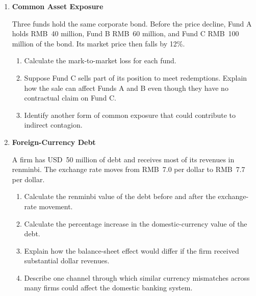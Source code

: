 \begin{enumerate}
\begin{enumerate}
\end{enumerate}


\item \textbf{Common Asset Exposure}

Three funds hold the same corporate bond. Before the price decline, Fund A holds RMB~40 million, Fund B RMB~60 million, and Fund C RMB~100 million of the bond. Its market price then falls by 12\%.

\begin{enumerate}

\item Calculate the mark-to-market loss for each fund.

\item Suppose Fund C sells part of its position to meet redemptions. Explain how the sale can affect Funds A and B even though they have no contractual claim on Fund C.

\item Identify another form of common exposure that could contribute to indirect contagion.

\end{enumerate}


\item \textbf{Foreign-Currency Debt}

A firm has USD~50 million of debt and receives most of its revenues in renminbi. The exchange rate moves from RMB~7.0 per dollar to RMB~7.7 per dollar.

\begin{enumerate}

\item Calculate the renminbi value of the debt before and after the exchange-rate movement.

\item Calculate the percentage increase in the domestic-currency value of the debt.

\item Explain how the balance-sheet effect would differ if the firm received substantial dollar revenues.
\item Describe one channel through which similar currency mismatches across many firms could affect the domestic banking system.

\end{enumerate}

\end{enumerate}



